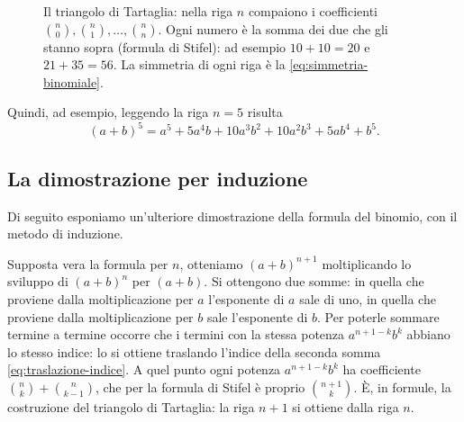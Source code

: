 \begin{figure}[htb]
\caption{Il triangolo di Tartaglia: nella riga $n$ compaiono i coefficienti
$\binom n0,\binom n1,\dots,\binom nn$. Ogni numero è la somma dei due che gli stanno
sopra (formula di Stifel): ad esempio $10+10=20$ e $21+35=56$. La simmetria di ogni riga
è la \eqref{eq:simmetria-binomiale}.}
\label{fig:tartaglia}
\end{figure}

Quindi, ad esempio, leggendo la riga $n=5$ risulta
\begin{equation}\label{eq:binomio-5}
  (a+b)^{5}=a^{5}+5a^{4}b+10a^{3}b^{2}+10a^{2}b^{3}+5ab^{4}+b^{5}.
\end{equation}

\subsection{La dimostrazione per induzione}

Di seguito esponiamo un'ulteriore dimostrazione della formula del binomio, con il metodo
di induzione.

\begin{strategia}
Supposta vera la formula per $n$, otteniamo $(a+b)^{n+1}$ moltiplicando lo sviluppo di
$(a+b)^{n}$ per $(a+b)$. Si ottengono due somme: in quella che proviene dalla
moltiplicazione per $a$ l'esponente di $a$ sale di uno, in quella che proviene dalla
moltiplicazione per $b$ sale l'esponente di $b$. Per poterle sommare termine a termine
occorre che i termini con la stessa potenza $a^{n+1-k}b^{k}$ abbiano lo stesso indice:
lo si ottiene traslando l'indice della seconda somma \eqref{eq:traslazione-indice}. A
quel punto ogni potenza $a^{n+1-k}b^{k}$ ha coefficiente $\binom nk+\binom n{k-1}$, che
per la formula di Stifel è proprio $\binom{n+1}k$. È, in formule, la costruzione del
triangolo di Tartaglia: la riga $n+1$ si ottiene dalla riga $n$.
\end{strategia}

